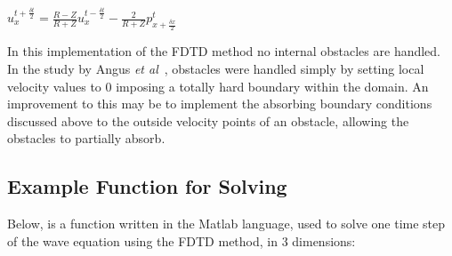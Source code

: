 \begin{center}
$ u^{t + \frac{\delta t}{2}}_{x} = \frac{R - Z}{R + Z} u^{t - \frac{\delta t}{2}}_{x} - \frac{2}{R + Z} p^{t}_{x+ \frac{\delta x}{2}} $\\
\end{center}
In this implementation of the FDTD method no internal obstacles are handled. In the study by Angus \textit{et al}~\cite{Angus2010}, obstacles were handled simply by setting local velocity  values to 0 imposing a totally hard boundary within the domain. An improvement to this may be to implement the absorbing boundary conditions discussed above to the outside velocity points of an obstacle, allowing the obstacles to partially absorb.

\subsection{Example Function for Solving}
Below, is a function written in the Matlab \textregistered language, used to solve one time step of the wave equation using the FDTD method, in 3 dimensions:


